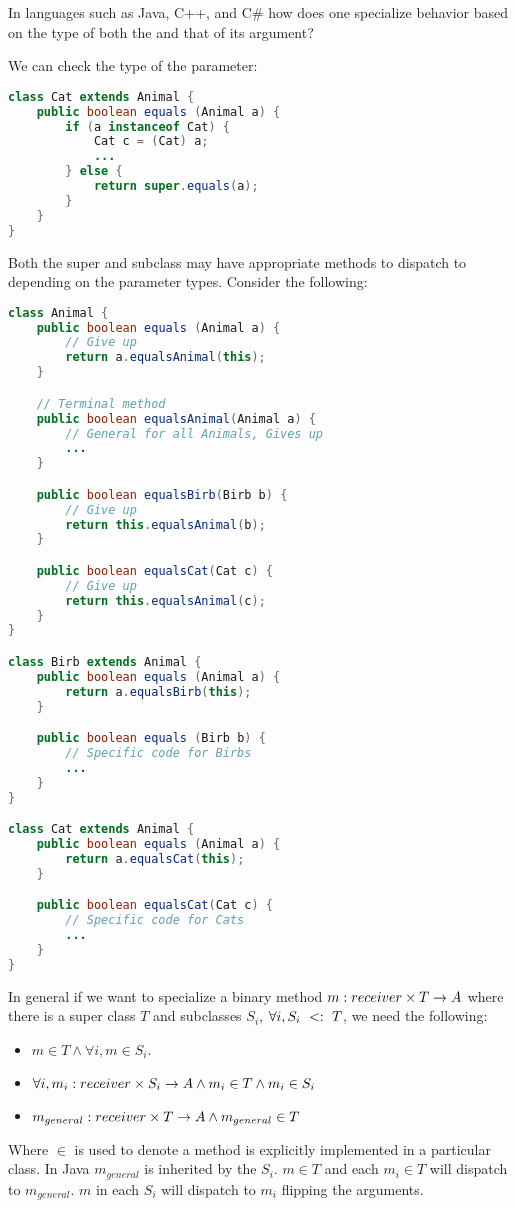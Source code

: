 \documentclass{article}
\begin{document}
In languages such as Java, C++, and C\# how does one specialize behavior based on the \dynamic{} type of both the \receiver{} and that of its argument?

\begin{example}
We can check the type of the parameter:
\begin{lstlisting}[language=Java]
class Cat extends Animal {
    public boolean equals (Animal a) {
        if (a instanceof Cat) {
            Cat c = (Cat) a;
            ...
        } else {
            return super.equals(a);
        }
    }
}
\end{lstlisting}
\end{example}

\begin{example}
Both the super and subclass may have appropriate methods to dispatch to depending on the parameter types.
Consider the following:
\begin{lstlisting}[language=Java]
class Animal {
    public boolean equals (Animal a) {
        // Give up
        return a.equalsAnimal(this);
    }

    // Terminal method
    public boolean equalsAnimal(Animal a) {
        // General for all Animals, Gives up
        ...
    }

    public boolean equalsBirb(Birb b) {
        // Give up
        return this.equalsAnimal(b);
    }

    public boolean equalsCat(Cat c) {
        // Give up
        return this.equalsAnimal(c);
    }
}

class Birb extends Animal {
    public boolean equals (Animal a) {
        return a.equalsBirb(this);
    }

    public boolean equals (Birb b) {
        // Specific code for Birbs
        ...
    }
}

class Cat extends Animal {
    public boolean equals (Animal a) {
        return a.equalsCat(this);
    }

    public boolean equalsCat(Cat c) {
        // Specific code for Cats
        ...
    }
}
\end{lstlisting}
In general if we want to specialize a binary method $m : receiver{} \times T \rightarrow A$ where there is a super class $T$ and subclasses $S_i$, $\forall i, S_i ~ <: ~ T$, we need the following:
\begin{itemize}
\item $m \in T \wedge \forall i, m \in S_i$.
\item $\forall i, m_i : receiver{} \times S_i \rightarrow A \wedge m_i \in T \wedge m_i \in S_i$
\item $m_{general} : receiver{} \times T \rightarrow A \wedge m_{general} \in T$
\end{itemize}
Where $\in$ is used to denote a method is explicitly implemented in a particular class.
In Java $m_{general}$ is inherited by the $S_i$. $m \in T$ and each $m_i \in T$ will dispatch to $m_{general}$. $m$ in each $S_i$ will dispatch to $m_i$ flipping the arguments.
\end{example}
\end{document}
